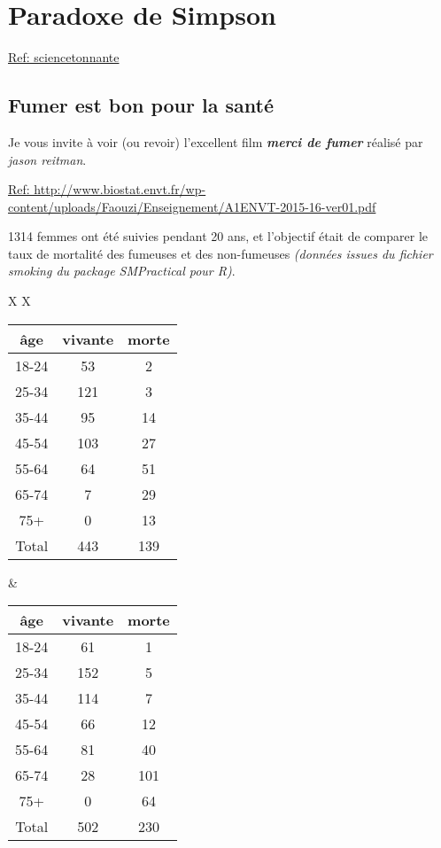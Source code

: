 \documentclass[10pt,dvipsnames, dvips, svgnames]{article}
\begin{document}
\section{Paradoxe de Simpson}


\href{https://sciencetonnante.wordpress.com/2013/04/29/le-paradoxe-de-simpson/}{Ref: sciencetonnante}


\subsection{Fumer est bon pour la santé}

Je vous invite à voir (ou revoir) l'excellent  film  \textit{\textbf{merci de fumer}}  réalisé par \textit{jason reitman}.
\medskip

\href{http://www.biostat.envt.fr/wp-content/uploads/Faouzi/Enseignement/A1ENVT-2015-16-ver01.pdf}{Ref: http://www.biostat.envt.fr/wp-content/uploads/Faouzi/Enseignement/A1ENVT-2015-16-ver01.pdf}


1314 femmes ont été suivies pendant 20 ans, et l'objectif était de comparer le taux de mortalité des fumeuses et des non-fumeuses  \textit{(données issues du fichier smoking du package SMPractical pour R)}.

\begin{tabularx}{\linewidth}{ X X }
    \centering
\begin{tabular}[]{|c |c |c |}
\hline âge  & vivante & morte \\
    \hline 18-24 &  53 & 2\\
    \hline 25-34 & 121 & 3\\
    \hline 35-44 &  95 & 14\\
    \hline 45-54 & 103 & 27\\
    \hline 55-64 &  64 & 51\\
    \hline 65-74 &   7 & 29\\
    \hline 75+   &   0 & 13\\
    \hline Total & 443 & 139\\
\hline 
\end{tabular}  
    \label{tab1}
    & 
    \centering
\begin{tabular}[]{|c |c |c |}
\hline âge  & vivante & morte \\
    \hline 18-24 & 61 & 1\\
    \hline 25-34 & 152 & 5\\
    \hline 35-44 & 114 & 7\\
    \hline 45-54 & 66 & 12\\
    \hline 55-64 & 81 & 40\\
    \hline 65-74 & 28 & 101\\
    \hline 75+   & 0 & 64\\
    \hline Total & 502 & 230\\
\hline 
\end{tabular}
    \label{tab2}
\end{tabularx}
\end{document}
